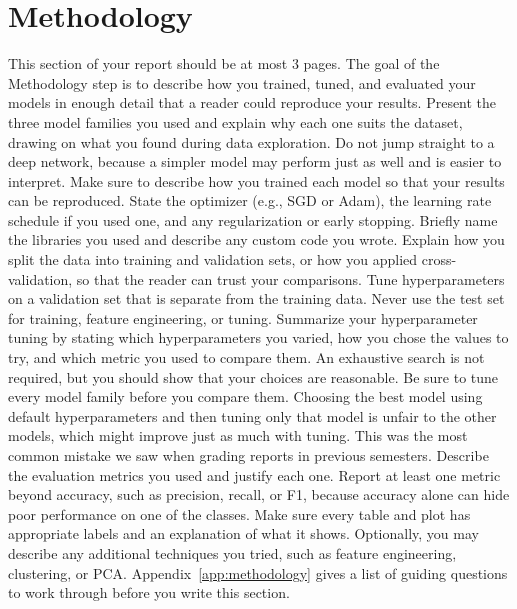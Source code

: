 \documentclass[12pt]{article}
\begin{document}
\section{Methodology}\label{sec:methodology}
This section of your report should be at most 3 pages.
The goal of the Methodology step is to describe how you trained, tuned, and
evaluated your models in enough detail that a reader could reproduce your results.
Present the three model families you used and explain why each one suits the
dataset, drawing on what you found during data exploration. Do not jump straight to
a deep network, because a simpler model may perform just as well and is easier to
interpret.
Make sure to describe how you trained each model so that your results can be
reproduced. State the optimizer (e.g., SGD or Adam), the learning rate schedule if
you used one, and any regularization or early stopping. Briefly name the libraries
you used and describe any custom code you wrote.
Explain how you split the data into training and validation sets, or how you
applied cross-validation, so that the reader can trust your comparisons. Tune
hyperparameters on a validation set that is separate from the training data. Never
use the test set for training, feature engineering, or tuning.
Summarize your hyperparameter tuning by stating which hyperparameters you varied,
how you chose the values to try, and which metric you used to compare them. An
exhaustive search is not required, but you should show that your choices are
reasonable.
Be sure to tune every model family before you compare them. Choosing the best model
using default hyperparameters and then tuning only that model is unfair to the
other models, which might improve just as much with tuning. This was the most
common mistake we saw when grading reports in previous semesters.
Describe the evaluation metrics you used and justify each one. Report at least one
metric beyond accuracy, such as precision, recall, or F1, because accuracy alone
can hide poor performance on one of the classes. Make sure every table and plot has
appropriate labels and an explanation of what it shows.
Optionally, you may describe any additional techniques you tried, such as feature
engineering, clustering, or PCA.
Appendix~\ref{app:methodology} gives a list of guiding questions to work through
before you write this section.
\end{document}

